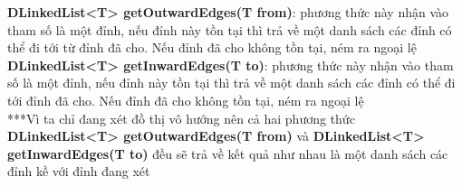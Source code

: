 \documentclass[a4paper]{article}
\begin{document}
\textbf{DLinkedList<T> getOutwardEdges(T from)}: phương thức này nhận vào tham số là một đỉnh, nếu đỉnh này tồn tại thì trả về một danh sách các đỉnh có thể đi tới từ đỉnh đã cho. Nếu đỉnh đã cho không tồn tại, ném ra ngoại lệ\\


\textbf{DLinkedList<T> getInwardEdges(T to)}:
phương thức này nhận vào tham số là một đỉnh, nếu đỉnh này tồn tại thì trả về một danh sách các đỉnh có thể đi tới đỉnh đã cho. Nếu đỉnh đã cho không tồn tại, ném ra ngoại lệ \\
***Vì ta chỉ đang xét đồ thị vô hướng nên cả hai phương thức \textbf{DLinkedList<T> getOutwardEdges(T from)} và \textbf{DLinkedList<T> getInwardEdges(T to)} đều sẽ trả về kết quả như nhau là một danh sách các đỉnh kề với đỉnh đang xét \\
\end{document}
